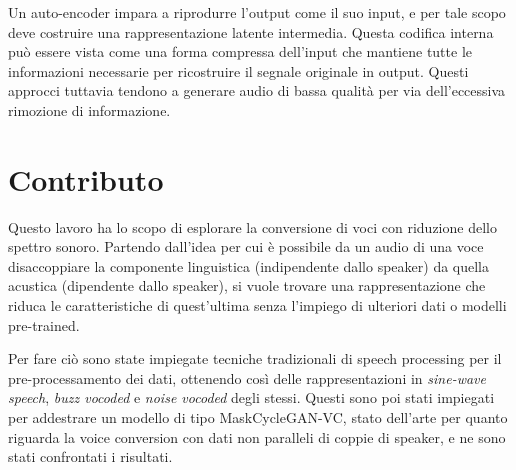 			Un auto-encoder impara a riprodurre l'output come il suo input, e per tale scopo deve costruire una rappresentazione latente intermedia. Questa codifica interna può essere vista come una forma compressa dell'input che mantiene tutte le informazioni necessarie per ricostruire il segnale originale in output.
			Questi approcci tuttavia tendono a generare audio di bassa qualità per via dell'eccessiva rimozione di informazione.
	
		\section{Contributo}
			Questo lavoro ha lo scopo di esplorare la conversione di voci con riduzione dello spettro sonoro. Partendo dall'idea per cui è possibile da un audio di una voce disaccoppiare la componente linguistica (indipendente dallo speaker) da quella acustica (dipendente dallo speaker), si vuole trovare una rappresentazione che riduca le caratteristiche di quest'ultima senza l'impiego di ulteriori dati o modelli pre-trained.
			
			Per fare ciò sono state impiegate tecniche tradizionali di speech processing per il pre-processamento dei dati, ottenendo così delle rappresentazioni in \textit{sine-wave speech}, \textit{buzz vocoded} e \textit{noise vocoded} degli stessi. Questi sono poi stati impiegati per addestrare un modello di tipo MaskCycleGAN-VC\cite{MaskCyclegan-VC}, stato dell'arte per quanto riguarda la voice conversion con dati non paralleli di coppie di speaker, e ne sono stati confrontati i risultati.
	